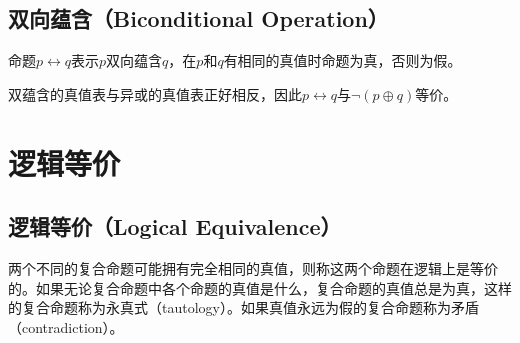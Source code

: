 \documentclass[12pt, openany, oneside]{book}
\begin{document}
\vspace{0.5cm}

\subsection{双向蕴含（Biconditional Operation）}

命题$ p \leftrightarrow q $表示$ p $双向蕴含$ q $，在$ p $和$ q $有相同的真值时命题为真，否则为假。

\begin{table}[H]
	\centering
	\caption{双向蕴含真值表}
\end{table}

双蕴含的真值表与异或的真值表正好相反，因此$ p \leftrightarrow q $与$ \neg (p \oplus q) $等价。

\newpage

\section{逻辑等价}

\subsection{逻辑等价（Logical Equivalence）}

两个不同的复合命题可能拥有完全相同的真值，则称这两个命题在逻辑上是等价的。如果无论复合命题中各个命题的真值是什么，复合命题的真值总是为真，这样的复合命题称为永真式（tautology）。如果真值永远为假的复合命题称为矛盾（contradiction）。

\begin{table}[H]
	\centering
	\caption{逻辑等价}
\end{table}
\end{document}
